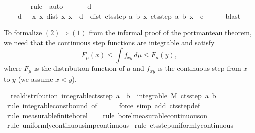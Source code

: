 \documentclass[leqno]{article}
\theoremstyle{definition}
\begin{document}
\begin{isabellebody}
\ \ \ \ \ \ \isamarkupfalse%
\ {\isacharparenleft}rule\ {\isacharasterisk}{\isacharcomma}\ auto{\isacharparenright}\isanewline
\ \ \isamarkupfalse%
\isanewline
\ \ \isamarkupfalse%
\ {\isacharbackquoteopen}{\isacharquery}d\ {\isachargreater}\ {}{\isacharbackquoteclose}\ \isamarkupfalse%
\ \isanewline
\ \ \ \ {\isachardoublequoteopen}{\isasymexists}d\ {\isachargreater}\ {}{\isachardot}\ {\isasymforall}x\ x{\isacharprime}{\isachardot}\ dist\ x{\isacharprime}\ x\ {\isacharless}\ d\ {\isasymlongrightarrow}\ dist\ {\isacharparenleft}cts{\isacharunderscore}step\ a\ b\ x{\isacharprime}{\isacharparenright}\ {\isacharparenleft}cts{\isacharunderscore}step\ a\ b\ x{\isacharparenright}\ {\isacharless}\ e{\isachardoublequoteclose}\isanewline
\ \ \ \ \isamarkupfalse%
\ blast\isanewline
{}
\end{isabellebody}

\medskip

To formalize $(2) \Longrightarrow (1)$ from the informal proof of the portmanteau theorem, we need that the continuous step functions are integrable and satisfy \[ F_\mu(x) \le \int f_{xy} \, d\mu \le F_\mu(y), \]
where $F_\mu$ is the distribution function of $\mu$ and $f_{xy}$ is the continuous step from $x$ to $y$ (we assume $x < y$).

\medskip

\begin{isabellebody}
\isamarkupfalse%
\ {\isacharparenleft}\ real{\isacharunderscore}distribution{\isacharparenright}\ integrable{\isacharunderscore}cts{\isacharunderscore}step{\isacharcolon}\ {\isachardoublequoteopen}a\ {\isacharless}\ b\ {\isasymLongrightarrow}\ integrable\ M\ {\isacharparenleft}cts{\isacharunderscore}step\ a\ b{\isacharparenright}{\isachardoublequoteclose}\isanewline
{}\isamarkupfalse%
\ {\isacharparenleft}rule\ integrable{\isacharunderscore}const{\isacharunderscore}bound\ {\isacharbrackleft}of\ {\isacharunderscore}\ {}{\isacharbrackright}{\isacharparenright}\isanewline
\ \ \isamarkupfalse%
\ {\isacharparenleft}force\ simp\ add{\isacharcolon}\ cts{\isacharunderscore}step{\isacharunderscore}def{\isacharparenright}\isanewline
\ \ \isamarkupfalse%
\ {\isacharparenleft}rule\ measurable{\isacharunderscore}finite{\isacharunderscore}borel{\isacharparenright}\isanewline
\ \ \isamarkupfalse%
\ {\isacharparenleft}rule\ borel{\isacharunderscore}measurable{\isacharunderscore}continuous{\isacharunderscore}on{}{\isacharparenright}\isanewline
\ \ \isamarkupfalse%
\ {\isacharparenleft}rule\ uniformly{\isacharunderscore}continuous{\isacharunderscore}imp{\isacharunderscore}continuous{\isacharparenright}\isanewline
{}\isamarkupfalse%
\ {\isacharparenleft}rule\ cts{\isacharunderscore}step{\isacharunderscore}uniformly{\isacharunderscore}continuous{\isacharparenright}
\end{isabellebody}
\end{document}
